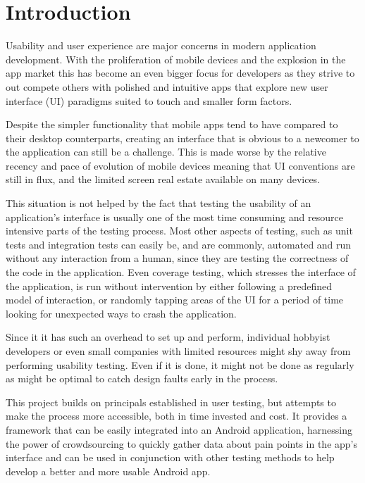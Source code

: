 \chapter{Introduction}

Usability and user experience are major concerns in modern application
development. With the proliferation of mobile devices and the explosion in the
app market this has become an even bigger focus for developers as they strive
to out compete others with polished and intuitive apps that explore new user
interface (UI) paradigms suited to touch and smaller form factors.

Despite the simpler functionality that mobile apps tend to have compared to
their desktop counterparts, creating an interface that is obvious to a newcomer
to the application can still be a challenge. This is made worse by the relative
recency and pace of evolution of mobile devices meaning that UI conventions are
still in flux, and the limited screen real estate available on many devices.

This situation is not helped by the fact that testing the usability of an
application's interface is usually one of the most time consuming and resource
intensive parts of the testing process. Most other aspects of testing, such as
unit tests and integration tests can easily be, and are commonly, automated and
run without any interaction from a human, since they are testing the
correctness of the code in the application. Even coverage testing, which
stresses the interface of the application, is run without intervention by
either following a predefined model of interaction, or randomly tapping areas
of the UI for a period of time looking for unexpected ways to crash the
application.

Since it it has such an overhead to set up and perform, individual hobbyist
developers or even small companies with limited resources might shy away from
performing usability testing. Even if it is done, it might not be done as
regularly as might be optimal to catch design faults early in the process.

This project builds on principals established in user testing, but attempts
to make the process more accessible, both in time invested and cost. It 
provides a framework that can be easily integrated into an Android application,
harnessing the power of crowdsourcing to quickly gather data about pain
points in the app's interface and can be used in conjunction with other
testing methods to help develop a better and more usable Android app.

